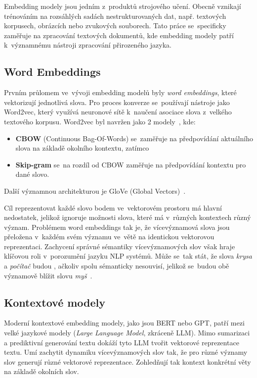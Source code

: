 Embedding modely jsou jedním z~produktů strojového učení. Obecně vznikají trénováním na rozsáhlých sadách nestrukturovaných dat, např. textových korpusech, obrázcích nebo zvukových souborech. Tato práce se~specificky zaměřuje na zpracování textových dokumentů, kde embedding modely patří k~významnému nástroji zpracování přirozeného jazyka. 

\subsection{Word Embeddings}
Prvním průlomem ve~vývoji embedding modelů byly \textit{word embeddings}, které vektorizují jednotlivá slova. Pro proces konverze se~používají nástroje jako Word2vec, který využívá neuronové sítě k~naučení asociace slova z~velkého textového korpusu. Word2vec byl navržen jako 2 modely~\cite{camacho-collados2018_word_sense_embeddings}, kde:
\begin{itemize}
    \item \textbf{CBOW} (Continuous Bag-Of-Words) se~zaměřuje na předpovídání aktuálního slova na základě okolního kontextu, zatímco
    \item \textbf{Skip-gram} se~na rozdíl od CBOW zaměřuje na předpovídání kontextu pro dané slovo.
\end{itemize} 
Další významnou architekturou je GloVe (Global Vectors)~\cite{pennington2014_glove}.

Cíl reprezentovat každé slovo bodem ve~vektorovém prostoru má hlavní nedostatek, jelikož ignoruje možnosti slova, které má v~různých kontextech různý význam. Problémem word embeddings tak je, že vícevýznamová slova jsou přeložena v~každém svém významu ve~větě na identickou vektorovou reprezentaci. Zachycení správné sémantiky vícevýznamových slov však hraje klíčovou roli v~porozumění jazyku NLP systémů. Může se~tak stát, že slova \textit{krysa} a \textit{počítač} budou , ačkoliv spolu sémanticky nesouvisí, jelikož se~budou obě významově blížit slovu \textit{myš}~\cite{camacho-collados2018_word_sense_embeddings}.

\subsection{Kontextové modely}
Moderní kontextové embedding modely, jako jsou BERT nebo GPT, patří mezi velké jazykové modely (\textit{Large Language Model}, zkráceně LLM). Mimo sumarizaci a prediktivní generování textu dokáží tyto LLM tvořit vektorové reprezentace textu. Umí zachytit dynamiku vícevýznamových slov tak, že pro různé významy slov generují různé vektorové reprezentace. Zohledňují tak kontext konkrétní věty na základě okolních slov.

